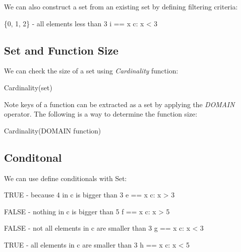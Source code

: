 We can also construct a set from an existing set by defining filtering criteria:\\

\begin{tla}
\* \{0, 1, 2\} - all elements less than 3
i == {x \in c: x < 3}   
\end{tla}
\begin{tlatex}
\@x{}%
%
\@xx{}%
%
\end{tlatex}

\subsection{Set and Function Size}

We can check the size of a set using \textit{Cardinality} function:\\

\begin{tla}
Cardinality(set) 
\end{tla}
\begin{tlatex}
%
\end{tlatex}

Note keys of a function can be extracted as a set by applying the
\textit{DOMAIN} operator. The following is a way to determine the function size:
\\

\begin{tla}
Cardinality(DOMAIN function) 
\end{tla}
\begin{tlatex}
%
\end{tlatex}

\subsection{Conditonal}

We can use define conditionals with Set:\\
\begin{tla}
\* TRUE - because 4 in c is bigger than 3
e == \E x \in c: x > 3  

\* FALSE - nothing in c is bigger than 5
f == \E x \in c: x > 5  

\* FALSE - not all elements in c are smaller than 3
g == \A x \in c: x < 3  

\* TRUE - all elements in c are smaller than 3
h == \A x \in c: x < 5  
\end{tla}
\begin{tlatex}
\@x{}%
%
\@xx{}%
%
\@pvspace{8.0pt}%
\@x{}%
%
\@xx{}%
%
\@pvspace{8.0pt}%
\@x{}%
%
\@xx{}%
%
\@pvspace{8.0pt}%
\@x{}%
%
\@xx{}%
%
\end{tlatex}

